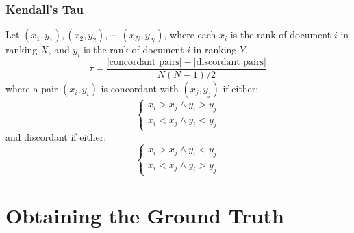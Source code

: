 \documentclass[svgnames]{beamer}
\begin{document}
\begin{frame}
    \frametitle{Kendall's Tau}

    \begin{block}{}
        Let $(x_1, y_1), (x_2, y_2), \cdots, (x_N, y_N)$, where each $x_i$ is
        the rank of document $i$ in ranking $X$, and $y_i$ is the rank of
        document $i$ in ranking $Y$.
        \begin{displaymath}
            \tau = \frac{|\text{concordant pairs}| - |\text{discordant pairs}|}{N(N-1)/2}
        \end{displaymath}
        \small
        where a pair $(x_i, y_i)$ is concordant with $(x_j, y_j)$ if either:
        \begin{displaymath}
            \left\{
                  \begin{array}{l}
                    x_i > x_j \wedge y_i > y_j\\
                    x_i < x_j \wedge y_i < y_j
                  \end{array}
            \right.
        \end{displaymath}
        and discordant if either:
        \begin{displaymath}
            \left\{
                  \begin{array}{l}
                    x_i > x_j \wedge y_i < y_j\\
                    x_i < x_j \wedge y_i > y_j
                  \end{array}
            \right.
        \end{displaymath}
    \end{block}

\end{frame}


\section{Obtaining the Ground Truth}
\end{document}
